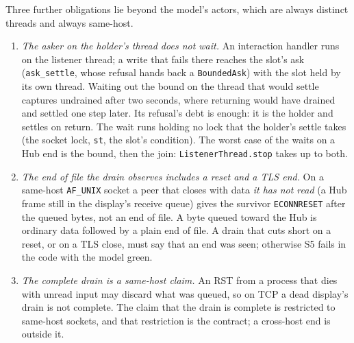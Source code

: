 \documentclass[a4paper,10pt,fleqn]{article}
\begin{document}
Three further obligations lie beyond the model's actors, which are always
distinct threads and always same-host.
\begin{enumerate}
  \item \emph{The asker on the holder's thread does not wait.}  An interaction
    handler runs on the listener thread; a write that fails there reaches
    the slot's ask (\texttt{ask\_settle}, whose refusal hands back a
    \texttt{BoundedAsk}) with the slot held by its own thread.  Waiting out the
    bound on the thread that would settle captures undrained after two seconds,
    where returning would have drained and settled one step later.  Its refusal's
    debt is enough: it is the holder and settles on return.  The wait runs holding
    no lock that the holder's settle takes (the socket lock, \texttt{st}, the
    slot's condition).  The worst case of the waits on a Hub end is the bound,
    then the join: \texttt{ListenerThread.stop} takes up to both.
  \item \emph{The end of file the drain observes includes a reset and a TLS
    end.}  On a same-host \texttt{AF\_UNIX} socket a peer that closes with data
    \emph{it has not read} (a Hub frame still in the display's receive queue)
    gives the survivor \texttt{ECONNRESET} after the queued bytes, not an end of
    file.  A byte queued toward the Hub is ordinary data followed by a plain end
    of file.  A drain that cuts short on a reset, or on a TLS close, must say
    that an end was seen; otherwise S5 fails in the code with the model green.
  \item \emph{The complete drain is a same-host claim.}  An RST from a process
    that dies with unread input may discard what was queued, so on TCP a dead
    display's drain is not complete.  The claim that the drain is complete is
    restricted to same-host sockets, and that restriction is the contract; a
    cross-host end is outside it.
\end{enumerate}
\end{document}
